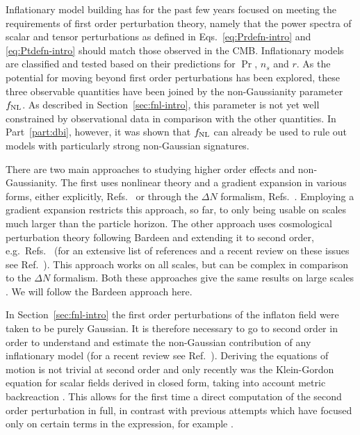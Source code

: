 Inflationary model building has for the past few years focused on
meeting the requirements of first order perturbation theory, namely
that the power spectra of scalar and tensor perturbations as defined in
Eqs.~\eqref{eq:Prdefn-intro} and \eqref{eq:Ptdefn-intro} should match
those observed in the CMB.  Inflationary
models are classified and tested based on their predictions for $\Pr$, $n_s$ and
$r$. As the
potential for moving beyond first order perturbations has been
explored, these three observable quantities have been joined by the non-Gaussianity
parameter $f_{\mathrm{NL}}$. As described in Section~\ref{sec:fnl-intro}, this parameter is
not yet well constrained by observational data in comparison with the
other quantities. In Part~\ref{part:dbi}, however, it was shown that $f_{\mathrm{NL}}$ can
already be used to rule out models with particularly strong non-Gaussian signatures.


There are two main approaches to studying higher order effects and
non-Gaussianity.  
The first uses nonlinear theory and a gradient expansion in various
forms, either explicitly, \eg
Refs.~\cite{Salopek:1990jq,Rigopoulos:2005xx} or through the
$\Delta N$ formalism, \eg
Refs.~\cite{Starobinsky:1982ee,
Starobinsky:1986fxa, Sasaki:1995aw, Sasaki:1998ug,
Lyth:2004gb,Lyth:2005fi,Langlois:2006vv}.
Employing a gradient expansion restricts this approach, so
far, to only being usable on scales much larger than the particle horizon.  
The
other approach uses cosmological perturbation theory following Bardeen
\cite{Bardeen:1980kt} and extending it to second order,
e.g.~Refs.~\cite{Tomita:1967,Mukhanov:1996ak,Bruni:1996im,
  Acquaviva:2002ud,Nakamura:2003wk,Noh:2004bc,
  Bernardeau:2002jy,Maldacena:2002vr,
  Finelli:2003bp,Bartolo:2004if,Enqvist:2004bk,Lyth:2005du,Seery:2005gb,
  Malik:2003mv, Barnaby:2006cq}
(for an extensive list of references and a recent review on these
issues see Ref.~\cite{Malik:2008im}).
%
This approach works on all scales, but can be complex in comparison to the
$\Delta N$ formalism. Both these approaches give the
same results on large scales \cite{Malik:2005cy}. We
will follow the Bardeen approach here.


In Section~\ref{sec:fnl-intro} the first order perturbations of the inflaton field
were taken to be purely Gaussian. It is therefore 
necessary to go to second order in order to understand and estimate
the non-Gaussian contribution of any inflationary model (for a recent
review see Ref.~\cite{Malik:2008im}). Deriving the equations of motion is
not trivial at second order and only recently was the Klein-Gordon
equation for scalar fields derived in closed form, taking into account
metric backreaction \cite{Malik:2006ir}. This allows for the first time
a direct computation of the second order perturbation in full, in
contrast with previous attempts which have focused only on certain
terms in the expression, for example .


